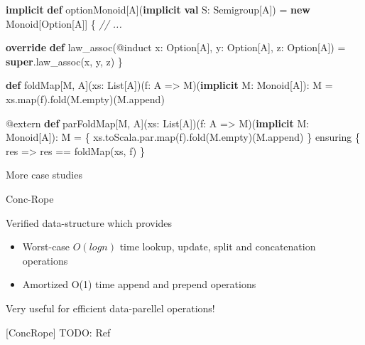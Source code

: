 \documentclass[
  ignorenonframetext,
]{beamer}
\newenvironment{Shaded}{}{}
\newcommand{\CommentTok}[1]{\textcolor[rgb]{0.38,0.63,0.69}{\textit{#1}}}
\newcommand{\FunctionTok}[1]{\textcolor[rgb]{0.02,0.16,0.49}{#1}}
\newcommand{\KeywordTok}[1]{\textcolor[rgb]{0.00,0.44,0.13}{\textbf{#1}}}
\newcommand{\NormalTok}[1]{#1}
\providecommand{\tightlist}{%
  \setlength{\itemsep}{0pt}\setlength{\parskip}{0pt}}
\begin{document}
\begin{frame}[fragile]

\begin{Shaded}
\begin{Highlighting}[]
\KeywordTok{implicit} \KeywordTok{def}\NormalTok{ optionMonoid[A](}\KeywordTok{implicit} \KeywordTok{val}\NormalTok{ S: Semigroup[A]) =}
  \KeywordTok{new}\NormalTok{ Monoid[Option[A]] \{}
    \CommentTok{// ...}

    \KeywordTok{override} \KeywordTok{def} \FunctionTok{law_assoc}\NormalTok{(@induct x: Option[A], y: Option[A], z: Option[A]) =}
      \KeywordTok{super}\NormalTok{.}\FunctionTok{law_assoc}\NormalTok{(x, y, z)}
\NormalTok{  \}}
\end{Highlighting}
\end{Shaded}

\end{frame}

\begin{frame}[fragile]

\begin{Shaded}
\begin{Highlighting}[]
\KeywordTok{def}\NormalTok{ foldMap[M, A](xs: List[A])(f: A => M)(}\KeywordTok{implicit}\NormalTok{ M: Monoid[A]): M =}
\NormalTok{  xs.}\FunctionTok{map}\NormalTok{(f).}\FunctionTok{fold}\NormalTok{(M.}\FunctionTok{empty}\NormalTok{)(M.}\FunctionTok{append}\NormalTok{)}

\NormalTok{@extern}
\KeywordTok{def}\NormalTok{ parFoldMap[M, A](xs: List[A])(f: A => M)(}\KeywordTok{implicit}\NormalTok{ M: Monoid[A]): M = \{}
\NormalTok{  xs.}\FunctionTok{toScala}\NormalTok{.}\FunctionTok{par}\NormalTok{.}\FunctionTok{map}\NormalTok{(f).}\FunctionTok{fold}\NormalTok{(M.}\FunctionTok{empty}\NormalTok{)(M.}\FunctionTok{append}\NormalTok{)}
\NormalTok{\} ensuring \{ res =>}
\NormalTok{  res == }\FunctionTok{foldMap}\NormalTok{(xs, f)}
\NormalTok{\}}
\end{Highlighting}
\end{Shaded}

\end{frame}

\begin{frame}{More case studies}
\protect\hypertarget{more-case-studies}{}

\end{frame}

\begin{frame}{Conc-Rope}
\protect\hypertarget{conc-rope}{}

Verified data-structure which provides

\begin{itemize}
\tightlist
\item
  Worst-case \(O(log n)\) time lookup, update, split and concatenation
  operations
\item
  Amortized O(1) time append and prepend operations
\end{itemize}

Very useful for efficient data-parellel operations!

{[}ConcRope{]} TODO: Ref

\end{frame}
\end{document}
